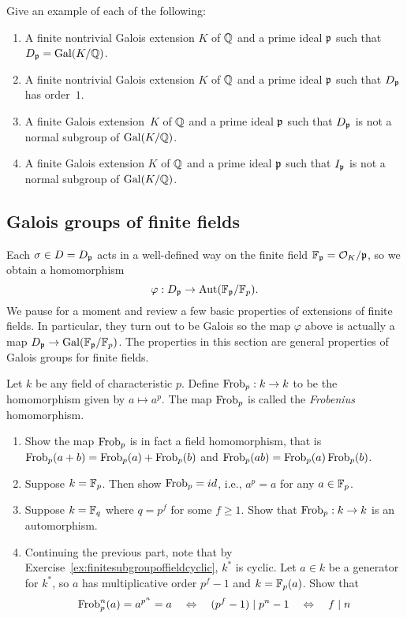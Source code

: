 \begin{exercise}
  Give an example of each of the following:
  \begin{enumerate}
    \item A finite nontrivial Galois extension $K$
    of $\mathbb{Q}$ and a prime ideal $\mathfrak{p}$ such that $D_{\mathfrak{p}} = \operatorname{Gal}(K/\mathbb{Q})$.
    \item A finite nontrivial Galois extension $K$ of
    $\mathbb{Q}$ and a prime ideal $\mathfrak{p}$ such that $D_{\mathfrak{p}}$ has order~$1$.
    \item A finite Galois extension~$K$ of
    $\mathbb{Q}$ and a prime ideal $\mathfrak{p}$ such that $D_{\mathfrak{p}}$ is not a normal
    subgroup of $\operatorname{Gal}(K/\mathbb{Q})$.
    \item A finite Galois extension $K$ of
    $\mathbb{Q}$ and a prime ideal $\mathfrak{p}$ such that $I_{\mathfrak{p}}$ is not a normal
    subgroup of $\operatorname{Gal}(K/\mathbb{Q})$.
  \end{enumerate}
\end{exercise}

\subsection{Galois groups of finite fields}\label{sec:galoisfinite}

Each $\sigma \in D = D_{\mathfrak{p}}$ acts in a well-defined
way on the finite field $\mathbb{F}_{\mathfrak{p}} = \mathcal{O}_K/\mathfrak{p}$, so we obtain
a homomorphism
\[
  \varphi: D_{\mathfrak{p}} \to \operatorname{Aut}(\mathbb{F}_{\mathfrak{p}}/\mathbb{F}_p).
\]
We pause for a moment and review a few basic properties of
extensions of finite fields. In particular, they turn out
to be Galois so the map $\varphi$ above is actually a map
$D_{\mathfrak{p}} \to \operatorname{Gal}(\mathbb{F}_{\mathfrak{p}}/\mathbb{F}_p)$.
The properties in this section are general properties
of Galois groups for finite fields.

\begin{definition}
  Let $k$ be any field of characteristic $p$.
  Define $\operatorname{Frob}_p: k \to k$ to be the homomorphism
  given by $a\mapsto a^p$. The map $\operatorname{Frob}_p$ is
  called the \emph{Frobenius} homomorphism.
\end{definition}

\begin{exercise}\label{ex:frob}
  \hfill
  \begin{enumerate}
    \item Show the map $\operatorname{Frob}_p$ is in fact a field homomorphism,
    that is $\operatorname{Frob}_p(a + b) = \operatorname{Frob}_p(a) + \operatorname{Frob}_p(b)$
    and $\operatorname{Frob}_p(ab) = \operatorname{Frob}_p(a)\operatorname{Frob}_p(b)$.
    \item Suppose $k = \mathbb{F}_p$. Then show $\operatorname{Frob}_p = id$, i.e.,
    $a^p = a$ for any $a\in\mathbb{F}_p$.
    \item Suppose $k = \mathbb{F}_{q}$ where $q=p^f$ for some $f\geq 1$.
    Show that $\operatorname{Frob}_p:k\to k$ is an automorphism.
    \item Continuing the previous part, note that by
    Exercise~\ref{ex:finitesubgroupoffieldcyclic}, $k^*$ is cyclic.
    Let $a\in k$ be a generator for $k^*$,
    so $a$ has multiplicative order $p^f-1$ and $k = \mathbb{F}_p(a)$.
    Show that
    \[
      \operatorname{Frob}_p^n(a) = a^{p^n} = a
      \quad\Leftrightarrow\quad (p^f - 1) \mid p^n - 1
      \quad\Leftrightarrow\quad f \mid n
    \]
  \end{enumerate}
\end{exercise}

